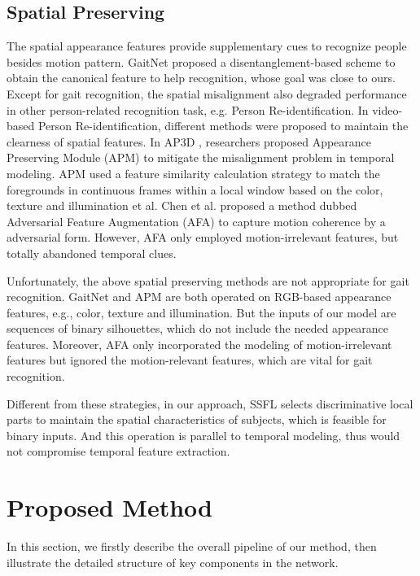 \documentclass[journal]{IEEEtran}
\begin{document}
\subsection{Spatial Preserving}
The spatial appearance features provide supplementary cues to recognize people besides motion pattern. GaitNet \cite{zhang2020learning} proposed a disentanglement-based scheme to obtain the canonical feature to help recognition, whose goal was close to ours. Except for gait recognition, the spatial misalignment also degraded performance in other person-related recognition task, e.g. Person Re-identification. In video-based Person Re-identification, different methods were proposed to maintain the clearness of spatial features. In AP3D \cite{gu2020appearance}, researchers proposed Appearance Preserving Module (APM) to mitigate the misalignment problem in temporal modeling. APM used a feature similarity calculation strategy to match the foregrounds in continuous frames within a local window based on the color, texture and illumination et al. Chen et al. \cite{chen2020temporal} proposed a method dubbed Adversarial Feature Augmentation (AFA) to capture motion coherence by a adversarial form. However, AFA only employed motion-irrelevant features, but totally abandoned temporal clues.
 
Unfortunately, the above spatial preserving methods are not appropriate for gait recognition. GaitNet and APM are both operated on RGB-based appearance features, e.g., color, texture and illumination. But the inputs of our model are sequences of binary silhouettes, which do not include the needed appearance features. Moreover, AFA only incorporated the modeling of motion-irrelevant features but ignored the motion-relevant features, which are vital for gait recognition. 

Different from these strategies, in our approach, SSFL selects discriminative local parts to maintain the spatial characteristics of subjects, which is feasible for binary inputs. And this operation is parallel to temporal modeling, thus would not compromise temporal feature extraction.

\section{Proposed Method}
\label{proposed_method}
In this section, we firstly describe the overall pipeline of our method, then illustrate the detailed structure of key components in the network.
\end{document}
